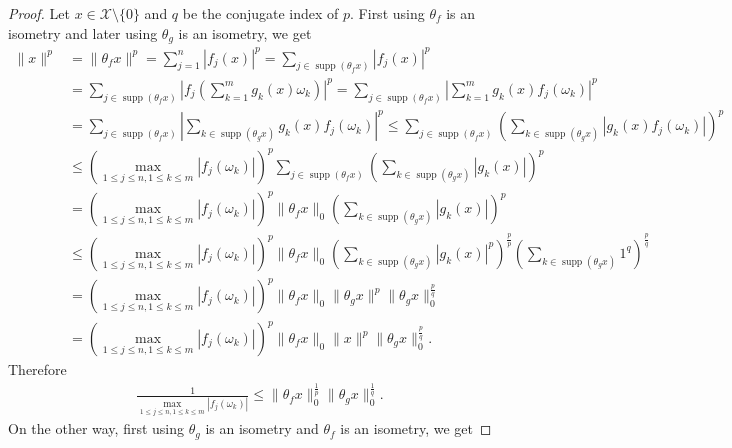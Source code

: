 \documentclass{amsart}
\begin{document}
\begin{proof}
	Let $x \in \mathcal{X}\setminus\{0\}$ and $q$ be the conjugate index of $p$. First using $\theta_f$ is an isometry and later using $\theta_g$ is an isometry, we get 
	\begin{align*}
\|x\|^p&=\|\theta_fx\|^p=\sum_{j=1}^n|f_j(x)|^p=\sum_{j \in \operatorname{supp}(\theta_fx)}|f_j(x)|^p\\
&=\sum_{j\in \operatorname{supp}(\theta_fx)}\left|f_j\left(\sum_{k=1}^mg_k(x)\omega_k\right)\right|^p
=\sum_{j \in \operatorname{supp}(\theta_fx)}\left|\sum_{k=1}^mg_k(x)f_j(\omega_k)\right|^p\\
&=\sum_{j \in \operatorname{supp}(\theta_fx)}\left|\sum_{k \in  \operatorname{supp}(\theta_gx)}g_k(x)f_j(\omega_k)\right|^p\leq \sum_{j \in \operatorname{supp}(\theta_fx)}\left(\sum_{k \in  \operatorname{supp}(\theta_gx)}|g_k(x)f_j(\omega_k)|\right)^p\\
&\leq \left(\displaystyle\max_{1\leq j\leq n, 1\leq k\leq m}|f_j(\omega_k)|\right)^p\sum_{j \in \operatorname{supp}(\theta_fx)}\left(\sum_{k \in  \operatorname{supp}(\theta_gx)}|g_k(x)|\right)^p\\
&=\left(\displaystyle\max_{1\leq j\leq n, 1\leq k\leq m}|f_j(\omega_k)|\right)^p \|\theta_f x\|_0\left(\sum_{k \in  \operatorname{supp}(\theta_gx)}|g_k(x)|\right)^p\\
&\leq \left(\displaystyle\max_{1\leq j\leq n, 1\leq k\leq m}|f_j(\omega_k)|\right)^p \|\theta_f x\|_0\left(\sum_{k \in  \operatorname{supp}(\theta_gx)}|g_k(x)|^p\right)^\frac{p}{p}\left(\sum_{k \in  \operatorname{supp}(\theta_gx)}1^q\right)^\frac{p}{q}\\
&=\left(\displaystyle\max_{1\leq j\leq n, 1\leq k\leq m}|f_j(\omega_k)|\right)^p \|\theta_f x\|_0\|\theta_g x\|^p\|\theta_g x\|_0^\frac{p}{q}\\
&=\left(\displaystyle\max_{1\leq j\leq n, 1\leq k\leq m}|f_j(\omega_k)|\right)^p \|\theta_f x\|_0\|x\|^p\|\theta_g x\|_0^\frac{p}{q}.
	\end{align*}
Therefore 
\begin{align*}
	\frac{1}{\displaystyle\max_{1\leq j\leq n, 1\leq k\leq m}|f_j(\omega_k)|}\leq \|\theta_f x\|_0^\frac{1}{p}\|\theta_g x\|_0^\frac{1}{q}.
\end{align*}
On the other way, first using $\theta_g$ is an isometry and $\theta_f$ is an isometry, we get


\end{proof}
\end{document}
